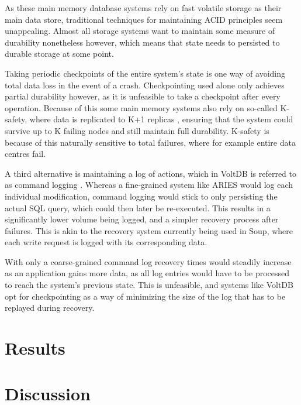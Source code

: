 \documentclass[b5paper]{report}
\begin{document}
As these main memory database systems rely on fast volatile storage as their
main data store, traditional techniques for maintaining ACID principles seem
unappealing. Almost all storage systems want to maintain some measure of
durability nonetheless however, which means that state needs to persisted to
durable storage at some point.

Taking periodic checkpoints of the entire system's state is one way of avoiding
total data loss in the event of a crash. Checkpointing used alone only achieves
partial durability however, as it is unfeasible to take a checkpoint after every
operation. Because of this some main memory systems also rely on so-called
K-safety, where data is replicated to K+1 replicas \cite{memory-checkpoint},
ensuring that the system could survive up to K failing nodes and still maintain
full durability. K-safety is because of this naturally sensitive to total
failures, where for example entire data centres fail.

A third alternative is maintaining a log of actions, which in VoltDB is referred
to as command logging \cite{voltdb-recovery}. Whereas a fine-grained system like
ARIES would log each individual modification, command logging would stick to
only persisting the actual SQL query, which could then later be re-executed.
This results in a significantly lower volume being logged, and a simpler
recovery process after failures. This is akin to the recovery system currently
being used in Soup, where each write request is logged with its corresponding
data.

With only a coarse-grained command log recovery times would steadily increase as
an application gains more data, as all log entries would have to be processed to
reach the system's previous state. This is unfeasible, and systems like VoltDB
opt for checkpointing as a way of minimizing the size of the log that has to be
replayed during recovery.

\chapter{Results}
\chapter{Discussion}



\end{document}
